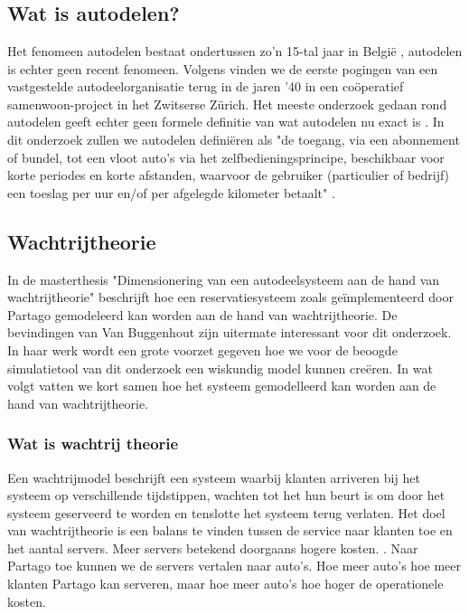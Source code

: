 \chapter{}
\label{ch:stand-van-zaken}



\section{Wat is autodelen?}
Het fenomeen autodelen bestaat ondertussen zo'n 15-tal jaar in België \autocite{ing}, autodelen is echter geen recent fenomeen. Volgens \textcite{millardball} vinden we de eerste pogingen van een vastgestelde autodeelorganisatie terug in de jaren '40 in een coöperatief samenwoon-project in het Zwitserse Zürich. Het meeste onderzoek gedaan rond autodelen geeft echter geen formele definitie van wat autodelen nu exact is \autocite{millardball}. In dit onderzoek zullen we autodelen definiëren als "de toegang, via een abonnement of bundel, tot een vloot auto's via het zelfbedieningsprincipe, beschikbaar voor korte periodes en korte afstanden, waarvoor de gebruiker (particulier of bedrijf) een toeslag per uur en/of per afgelegde kilometer betaalt" \autocite{ing}.

\section{Wachtrijtheorie}
In de masterthesis "Dimensionering van een autodeelsysteem aan de hand van wachtrijtheorie" beschrijft \textcite{van-buggenhout} hoe een reservatiesysteem zoals geïmplementeerd door Partago gemodeleerd kan worden aan de hand van wachtrijtheorie. De bevindingen van Van Buggenhout zijn uitermate interessant voor dit onderzoek. In haar werk wordt een grote voorzet gegeven hoe we voor de beoogde simulatietool van dit onderzoek een wiskundig model kunnen creëren. In wat volgt vatten we kort samen hoe het systeem gemodelleerd kan worden aan de hand van wachtrijtheorie.

\subsection{Wat is wachtrij theorie}
Een wachtrijmodel beschrijft een systeem waarbij klanten arriveren bij het systeem op verschillende tijdstippen, wachten tot het hun beurt is om door het systeem geserveerd te worden en tenslotte het systeem terug verlaten. Het doel van wachtrijtheorie is een balans te vinden tussen de service naar klanten toe en het aantal servers. Meer servers betekend doorgaans hogere kosten. \textcite{van-buggenhout}. Naar Partago toe kunnen we de servers vertalen naar auto's. Hoe meer auto's hoe meer klanten Partago kan serveren, maar hoe meer auto's hoe hoger de operationele kosten. 

